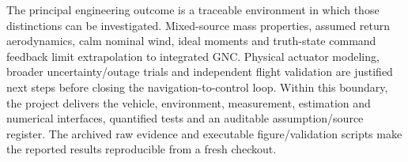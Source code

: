 The principal engineering outcome is a traceable environment in which those distinctions can be investigated. Mixed-source mass properties, assumed return aerodynamics, calm nominal wind, ideal moments and truth-state command feedback limit extrapolation to integrated GNC. Physical actuator modeling, broader uncertainty/outage trials and independent flight validation are justified next steps before closing the navigation-to-control loop. Within this boundary, the project delivers the vehicle, environment, measurement, estimation and numerical interfaces, quantified tests and an auditable assumption/source register. The archived raw evidence and executable figure/validation scripts make the reported results reproducible from a fresh checkout.
